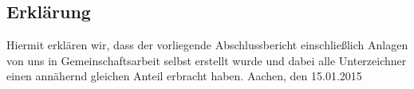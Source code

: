 \documentclass[a4paper, 12pt]{report}
\begin{document}
\begin{flushleft}
%
%
%
%
%
%
%
%


\listoffigures
 
 
%
%
%
%
%
%
%
%
%
%
%
%
%
%
%
%
%

\chapter{Erklärung}
Hiermit erklären wir, dass der vorliegende Abschlussbericht einschließlich Anlagen von uns in Gemeinschaftsarbeit selbst erstellt wurde und dabei alle Unterzeichner einen annähernd gleichen Anteil erbracht haben.\newline \newline
Aachen, den 15.01.2015
\newline \newline


\end{flushleft}
\end{document}
